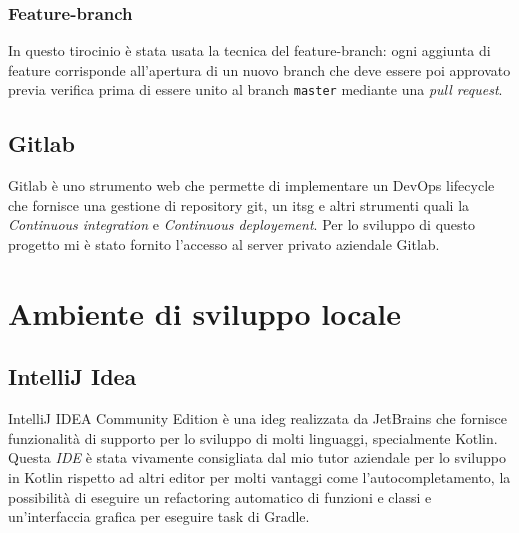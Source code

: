 \subsubsection*{Feature-branch}
In questo tirocinio è stata usata la tecnica del feature-branch: ogni aggiunta di feature corrisponde all'apertura di un nuovo branch che deve essere poi approvato previa verifica prima di essere unito al branch \verb|master| mediante una \emph{pull request}.

\subsection{Gitlab}
Gitlab è uno strumento web che permette di implementare un DevOps lifecycle che fornisce una gestione di repository git, un \gls{itsg} e altri strumenti quali la \emph{Continuous integration} e \emph{Continuous deployement}. Per lo sviluppo di questo progetto mi è stato fornito l'accesso al server privato aziendale Gitlab.

\section{Ambiente di sviluppo locale}
\subsection{IntelliJ Idea}
IntelliJ IDEA Community Edition è una \gls{ideg} realizzata da JetBrains che fornisce funzionalità di supporto per lo sviluppo di molti linguaggi, specialmente Kotlin. Questa \emph{IDE} è stata vivamente consigliata dal mio tutor aziendale per lo sviluppo in Kotlin rispetto ad altri editor per molti vantaggi come l'autocompletamento, la possibilità di eseguire un refactoring automatico di funzioni e classi e un'interfaccia grafica per eseguire task di Gradle.
 

